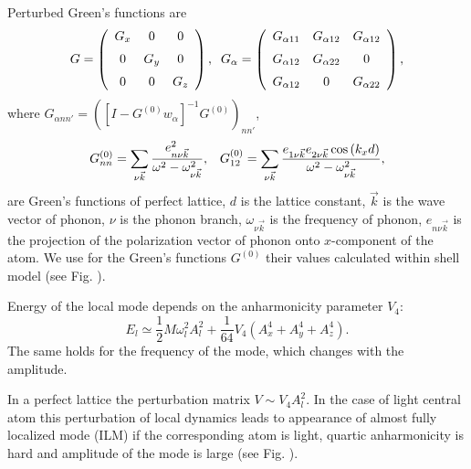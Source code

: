 Perturbed Green's functions are
\[ G = \left (\begin{array}{ccc}
G_x&0&0\\ \noalign{\medskip}
0&G_y&0\\ \noalign{\medskip}
0&0&G_z\end{array}
\right ) , \;\;
G_{\alpha} = \left (\begin{array}{ccc}
G_{\alpha 11}&G_{\alpha 12}&G_{\alpha 12}\\ \noalign{\medskip}
G_{\alpha 12}&G_{\alpha 22}&0\\ \noalign{\medskip}
G_{\alpha 12}&0&G_{\alpha 22}\end{array}
\right ) , \]
where $G_{\alpha nn'} = ([I-G^{(0)}w_{\alpha}]^{-1}G^{(0)})_{nn'}$,
\begin{equation}
G^{(0)}_{nn} = 
\sum_{\nu \vec{k}}\frac{e_{n \nu \vec{k}}^2}
{\omega^2-\omega^2_{\nu\vec{k}}}, \\\;\;\;
G^{(0)}_{12} =
\sum_{\nu \vec{k}}\frac{e_{1\nu \vec{k}} e_{2\nu \vec{k}}\cos{(k_{x}d)}}
{\omega^2-\omega^2_{\nu\vec{k}}},
\end{equation}
are Green's functions of perfect lattice, 
$d$ is the lattice constant, $\vec{k}$ is the wave vector 
of phonon, $\nu$ is the phonon branch, $\omega_{\nu\vec{k}}$ is the
frequency of phonon, $e_{n \nu\vec{k}}$ is the projection of the
polarization vector of phonon onto $x$-component of the atom. 
We use for the Green's functions $G^{(0)}$ their values
calculated within shell model \cite{shell} (see Fig.  ).

Energy of the local mode depends on the anharmonicity parameter $V_4$:\
\begin{equation}
E_l \simeq \frac{1}{2}M\omega_l^2 A_l^2 + \frac{1}{64}V_4(A_x^4+A_y^4+A_z^4).
\end{equation}
The same holds for the frequency of the mode, which changes with the amplitude.

In a perfect lattice the perturbation matrix $V \sim V_4 A_l^2$. 
In the case of light central atom this perturbation of local dynamics leads to
appearance of almost fully localized mode (ILM) if the corresponding atom is 
light, quartic anharmonicity is hard and amplitude of the mode is large 
(see Fig.  ).

